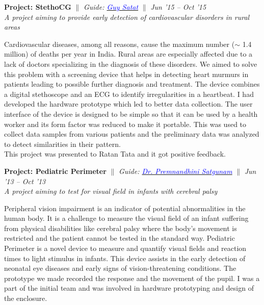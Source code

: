 \documentclass[margin,line]{res}
\newenvironment{list1}{
  \begin{list}{\ding{113}}{%
      \setlength{\itemsep}{0in}
      \setlength{\parsep}{0in} \setlength{\parskip}{0in}
      \setlength{\topsep}{0in} \setlength{\partopsep}{0in}
      \setlength{\leftmargin}{0.17in}}}{\end{list}}
\begin{document}
\begin{resume}
\begin{list1}
\item[]\textbf{Project: StethoCG} \hfill $\|$ \hfill {\em Guide: \href{http://web.media.mit.edu/~guysatat/}{\textcolor{blue} {Guy Satat}}} \hfill $\|$ \hfill {\textit{Jun '15 -- Oct '15}} \\
\textit{A project aiming to provide early  detection of cardiovascular disorders in rural areas}
\vspace{4pt}

\noindent Cardiovascular diseases, among all reasons, cause the maximum number ($\sim$ 1.4 million) of deaths per year in India. Rural areas are especially affected due to a lack of doctors specializing in the diagnosis of these disorders. We aimed to solve this problem with a screening device that helps in detecting heart murmurs in patients leading to possible further diagnosis and treatment. The device combines a digital stethoscope and an ECG to identify irregularities in a heartbeat. I had developed the hardware prototype which led to better data collection. The user interface of the device is designed to be simple so that it can be used by a health worker and its form factor was reduced to make it portable. This was used to collect data samples from various patients and the preliminary data was analyzed to detect similarities in their pattern.\\
This project was presented to Ratan Tata and it got positive feedback.\\
\vspace*{-.05in}

\item[]\textbf{Project: Pediatric Perimeter} \hfill $\|$ \hfill {\em Guide: \href{http://www.lvpei.org/our-team/our-team-Premnandhini.php}{\textcolor{blue} {Dr. Premnandhini Satgunam}}} \hfill $\|$ \hfill {\textit{Jun '13 -- Oct '13}} \\
\textit{A project aiming to test for visual field in infants with cerebral palsy}
\vspace{4pt}

\noindent Peripheral vision impairment is an indicator of potential abnormalities in the human body. It is a challenge to measure the visual field of an infant suffering from physical disabilities like cerebral palsy where the body's movement is restricted and the patient cannot be tested in the standard way. Pediatric Perimeter is a novel device to measure and quantify visual fields and reaction times to light stimulus in infants. This device assists in the early detection of neonatal eye diseases and early signs of vision-threatening conditions.
The prototype we made recorded the response and the movement of the pupil. I was a part of the initial team and was involved in hardware prototyping and design of the enclosure.


\end{list1}
\end{resume}
\end{document}
